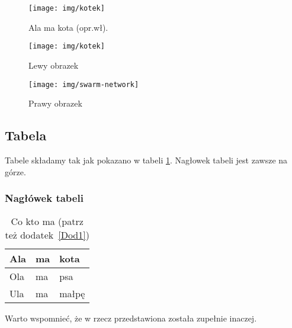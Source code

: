 \begin{figure}[h]
\centering\texttt{[image: img/kotek]}
\caption[Ala ma kota]{Ala ma kota (opr.wł).}\label{rysunek:kot}
\end{figure}

\lipsum[11-12]

\begin{figure}[h] 
	\centering
	\begin{minipage}[b]{0.45\textwidth}
		\centering\texttt{[image: img/kotek]} %
		\caption{Lewy obrazek}\label{rysunek:lewy}
	\end{minipage}
	\begin{minipage}[b]{0.45\textwidth}
		\centering
		\texttt{[image: img/swarm-network]} %
		\caption{Prawy obrazek}\label{rysunek:prawy}
	\end{minipage}
\end{figure}

\lipsum[13-14]


\subsection{Tabela}

Tabele składamy tak jak pokazano w tabeli \ref{tabela:coktoma}. Nagłowek tabeli jest zawsze na górze. \lipsum[15] 

\subsubsection{Nagłówek tabeli}

\begin{table}
\centering\caption[Co kto ma]{Co kto ma \cite{harel_rzecz_2008} (patrz też dodatek~\ref{Dod1}) \label{tabela:coktoma}}
\begin{tabular}{|l|l|l|}%
\hline
Ala & ma & kota \\
\hline
Ola & ma & psa \\
\hline
Ula & ma & małpę\\
\hline
\end{tabular}
\end{table}

\lipsum[19-20] Warto wspomnieć, że w \cite{aizawa_groundwater_2009} rzecz przedstawiona została zupełnie inaczej. 


